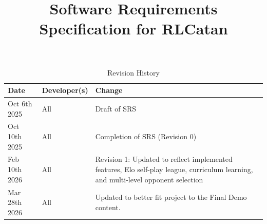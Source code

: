 \documentclass{article}
\title{Software Requirements Specification for RLCatan\\\progname}
\author{\authname}
\date{}
\begin{document}
\maketitle

\tableofcontents

\listoftables

\listoffigures

\newpage

\begin{table}[hp]
\caption{Revision History} \label{TblRevisionHistory}
\begin{tabularx}{\textwidth}{llX}
\toprule
\textbf{Date} & \textbf{Developer(s)} & \textbf{Change}\\
\midrule
Oct 6th 2025& All & Draft of SRS\\
Oct 10th 2025 & All & Completion of SRS (Revision 0)\\
Feb 10th 2026 & All & Revision 1: Updated to reflect implemented features, Elo self-play league, curriculum learning, and multi-level opponent selection\\
Mar 28th 2026 & All & Updated to better fit project to the Final Demo content. \\
\bottomrule
\end{tabularx}
\end{table}
\end{document}
